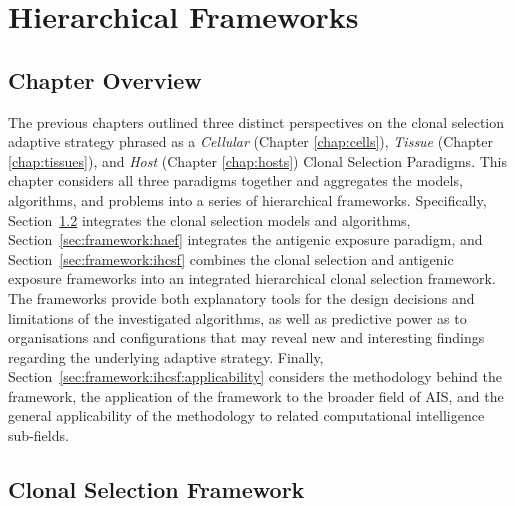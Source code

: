 %
%

\chapter{Hierarchical Frameworks}
\label{chap:framework}

%
%
\section{Chapter Overview}
\label{sec:framework:overview}
The previous chapters outlined three distinct perspectives on the clonal selection adaptive strategy phrased as a \emph{Cellular} (Chapter \ref{chap:cells}), \emph{Tissue} (Chapter \ref{chap:tissues}), and \emph{Host} (Chapter \ref{chap:hosts}) Clonal Selection Paradigms. 
This chapter considers all three paradigms together and aggregates the models, algorithms, and problems into a series of hierarchical frameworks. 
Specifically, Section~\ref{sec:framework:hcsf} integrates the clonal selection models and algorithms,  Section~\ref{sec:framework:haef} integrates the antigenic exposure paradigm, and Section~\ref{sec:framework:ihcsf} combines the clonal selection and antigenic exposure frameworks into an integrated hierarchical clonal selection framework.
The frameworks provide both explanatory tools for the design decisions and limitations of the investigated algorithms, as well as predictive power as to organisations and configurations that may reveal new and interesting findings regarding the underlying adaptive strategy. 
Finally, Section~\ref{sec:framework:ihcsf:applicability} considers the methodology behind the framework, the application of the framework to the broader field of AIS, and the general applicability of the methodology to related computational intelligence sub-fields.

%
%
\section{Clonal Selection Framework}
\label{sec:framework:hcsf}

%
%
